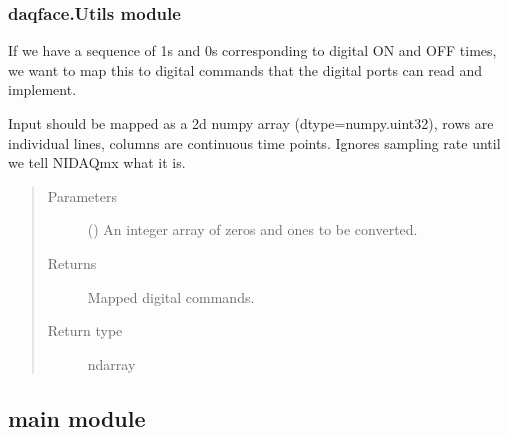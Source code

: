 \documentclass[letterpaper,10pt,english]{sphinxmanual}
\begin{document}
\subsubsection{daqface.Utils module}
\label{\detokenize{NoSeMazeController/daqface:module-daqface.Utils}}\label{\detokenize{NoSeMazeController/daqface:daqface-utils-module}}

\begin{fulllineitems}
\label{\detokenize{NoSeMazeController/daqface:daqface.Utils.binary_to_digital_map}}
\pysigstartsignatures
{}
\pysigstopsignatures
\sphinxAtStartPar
If we have a sequence of 1s and 0s corresponding to digital ON
and OFF times, we want to map this to digital commands that the digital
ports can read and implement.

\sphinxAtStartPar
Input should be mapped as a 2d numpy array (dtype=numpy.uint32), rows are
individual lines, columns are continuous time points. Ignores sampling
rate until we tell NIDAQmx what it is.
\begin{quote}\begin{description}
\item[{Parameters}] \leavevmode
\sphinxAtStartPar
{} () \textendash{} An integer array of zeros and ones to be converted.

\item[{Returns}] \leavevmode
\sphinxAtStartPar
{} \textendash{} Mapped digital commands.

\item[{Return type}] \leavevmode
\sphinxAtStartPar
ndarray

\end{description}\end{quote}

\end{fulllineitems}


\sphinxstepscope


\subsection{main module}
\label{\detokenize{NoSeMazeController/main:module-main}}\label{\detokenize{NoSeMazeController/main:main-module}}\label{\detokenize{NoSeMazeController/main::doc}}
\end{document}

